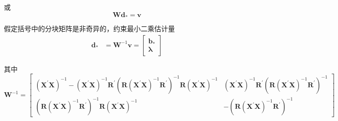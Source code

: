 	或
	$$ \boldsymbol{Wd}_{*}=\boldsymbol{v} $$

	假定括号中的分块矩阵是非奇异的，约束最小二乘估计量
	\begin{equation}
		\begin{aligned}
			\boldsymbol{d}_{*} & = \boldsymbol{W}^{-1}\boldsymbol{v} = \left[\begin{array}{l} \boldsymbol{b}_{*} \\ 
			\boldsymbol{\lambda}
			\end{array}\right]
		\end{aligned}
	\end{equation}

	其中
	$$  \boldsymbol{W}^{-1}=\left[ \begin{array}{cc}
			\left( \boldsymbol{X}^{\prime} \boldsymbol{X}\right)^{-1}-
			\left(\boldsymbol{X}^{\prime} \boldsymbol{X}\right)^{-1} 
			\boldsymbol{R}^{\prime}
			 \left(\boldsymbol{R}\left(\boldsymbol{X}^{\prime} \boldsymbol{X}\right)^{-1} \boldsymbol{R}^{\prime}\right)^{-1} \boldsymbol{R}\left(\boldsymbol{X}^{\prime} \boldsymbol{X}\right)^{-1} & 
			 \left(\boldsymbol{X}^{\prime} \boldsymbol{X}\right)^{-1} 
			 \boldsymbol{R}^{\prime}\left(\boldsymbol{R}
			 \left(\boldsymbol{X}^{\prime} 
			 \boldsymbol{X}\right)^{-1} \boldsymbol{R}^{\prime}\right)^{-1} \\
			\left(\boldsymbol{R}\left(\boldsymbol{X}^{\prime} \boldsymbol{X}\right)^{-1} \boldsymbol{R}^{\prime}\right)^{-1} 
			\boldsymbol{R}\left(\boldsymbol{X}^{\prime} \boldsymbol{X}\right)^{-1} & -
			\left(\boldsymbol{R}\left(\boldsymbol{X}^{\prime} \boldsymbol{X}\right)^{-1} \boldsymbol{}\boldsymbol{R}^{\prime}\right)^{-1}
	\end{array}\right] $$

